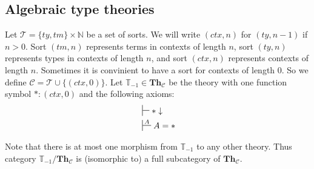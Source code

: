 \documentclass[reqno]{amsart}
\theoremstyle{definition}
\theoremstyle{remark}
\newcommand{\cat}[1]{\mathbf{#1}}
\newcommand{\Th}{\cat{Th}}
\newcommand{\ThC}{\Th_{\mathcal{C}}}
\numberwithin{figure}{section}
\begin{document}
\label{sec:T0}
\subsection{Algebraic type theories}

Let $\mathcal{T} = \{ ty, tm \} \times \mathbb{N}$ be a set of sorts.
We will write $(ctx,n)$ for $(ty,n-1)$ if $n > 0$.
Sort $(tm,n)$ represents terms in contexts of length $n$, sort $(ty,n)$ represents types in contexts of length $n$, and sort $(ctx,n)$ represents contexts of length $n$.
Sometimes it is convinient to have a sort for contexts of length 0.
So we define $\mathcal{C} = \mathcal{T} \cup \{ (ctx,0) \}$.
Let $\mathbb{T}_{-1} \in \ThC$ be the theory with one function symbol $* : (ctx,0)$ and the following axioms:
\begin{align*}
& \sststile{}{} * \downarrow \\
& \sststile{}{A} A = *
\end{align*}

Note that there is at most one morphism from $\mathbb{T}_{-1}$ to any other theory.
Thus category $\mathbb{T}_{-1}/\ThC$ is (isomorphic to) a full subcategory of $\ThC$.
\end{document}
